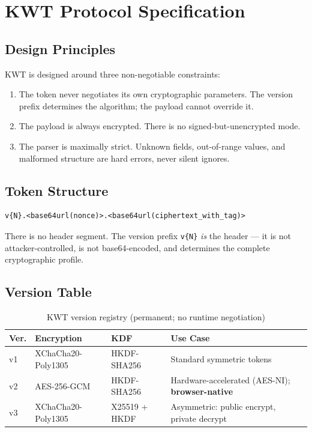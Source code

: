 \documentclass[11pt, letterpaper]{article}
\begin{document}
\section{KWT Protocol Specification}

\subsection{Design Principles}

KWT is designed around three non-negotiable constraints:

\begin{enumerate}[noitemsep]
  \item The token never negotiates its own cryptographic parameters. The version
        prefix determines the algorithm; the payload cannot override it.
  \item The payload is always encrypted. There is no signed-but-unencrypted mode.
  \item The parser is maximally strict. Unknown fields, out-of-range values,
        and malformed structure are hard errors, never silent ignores.
\end{enumerate}

\subsection{Token Structure}

\begin{lstlisting}
v{N}.<base64url(nonce)>.<base64url(ciphertext_with_tag)>
\end{lstlisting}

There is no header segment. The version prefix \texttt{v\{N\}} \emph{is} the
header — it is not attacker-controlled, is not base64-encoded, and determines
the complete cryptographic profile.

\subsection{Version Table}

\begin{table}[H]
\centering
\caption{KWT version registry (permanent; no runtime negotiation)}
\small
\begin{tabularx}{\linewidth}{C{1.0cm} L{3.2cm} L{2.4cm} X}
\toprule
{}
\color{white}\textbf{Ver.} &
\color{white}\textbf{Encryption} &
\color{white}\textbf{KDF} &
\color{white}\textbf{Use Case} \\
\midrule
v1 & XChaCha20-Poly1305 & HKDF-SHA256 & Standard symmetric tokens \\
v2 & AES-256-GCM        & HKDF-SHA256 & Hardware-accelerated (AES-NI); \textbf{browser-native} \\
v3 & XChaCha20-Poly1305 & X25519 + HKDF & Asymmetric: public encrypt, private decrypt \\
\bottomrule
\end{tabularx}
\end{table}
\end{document}

